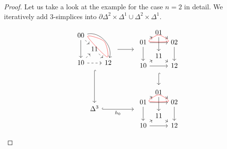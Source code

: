\begin{proof}
        
    Let us take a look at the example for the case $n=2$ in detail.
    We iteratively add 3-simplices into $\partial \Delta^2 \times \Delta^1 \cup \Delta^2 \times \Delta^1$.
    \[
    \begin{tikzcd}
        \begin{tikzpicture}
            \node (A) at (-0.7,0.7) {$00$};
            \node (B) at (-0.7,-0.7) {$10$};
            \node (C) at (0.7,-0.7) {$12$};
            \node (D) at (0,0) {$11$};
            \draw [-> ] (A) -- (B);
            \draw[->] (A) to [bend left=60] (C);
            \draw [->, dashed] (A) -- (D);
            \draw [->, dashed] (B) -- (C);
            \draw [->, dashed] (B) -- (D);
            \draw [->, dashed] (D) -- (C);
            \draw [red] [smooth cycle] plot coordinates { (-0.35,0.75) (0.65,-0.3) (0.5,0.5)};
        \end{tikzpicture}
    \ar[r]
    \ar[d, hook]
    &
        \begin{tikzpicture}
            \node (A) at (0, 0.85) {$01$};
            \node (B) at (-0.8, 0.35) {$01$};
            \node (C) at (0.8, 0.35) {$02$};
            \node (D) at (0, -0.35) {$11$};
            \node (E) at (-0.8, -0.85) {$10$};
            \node (F) at (0.8, -0.85) {$12$};
            \draw[->] (A) to (C);
            \draw[->] (A) to (D);
            \draw[->] (B) to (C);
            \draw[->] (B) to (A);
            \draw[->] (B) to (E);
            \draw[->] (C) to (F);
            \draw[->] (D) to (F);
            \draw[->] (E) to (F);
            \draw[->] (E) to (D);
            \draw [red] [smooth cycle] plot coordinates { (0,0.83) (0.5,0.5) (-0.5,0.5)};
        \end{tikzpicture}
    \ar[d, hook]
    \\
    \Delta^3
    \ar[r, hook, "h_0"']
    &
        \begin{tikzpicture}
            \node (A) at (0, 0.85) {$01$};
            \node (B) at (-0.8, 0.35) {$01$};
            \node (C) at (0.8, 0.35) {$02$};
            \node (D) at (0, -0.35) {$11$};
            \node (E) at (-0.8, -0.85) {$10$};
            \node (F) at (0.8, -0.85) {$12$};
            \draw[->] (A) to (C);
            \draw[->] (A) to (D);
            \draw[->] (B) to (C);
            \draw[->] (B) to (A);
            \draw[->] (B) to (E);
            \draw[->] (C) to (F);
            \draw[->] (D) to (F);
            \draw[->] (E) to (F);
            \draw[->] (E) to (D);
            \draw [red] [smooth cycle] plot coordinates { (0,0.83) (0.5,0.5) (-0.5,0.5)};
        \end{tikzpicture}
    \end{tikzcd}
    \]
    

\end{proof}
